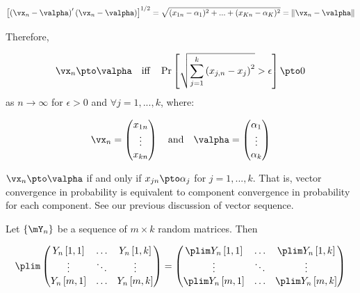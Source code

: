 \begin{equation*}
\left[\left(\vx_n - \valpha\right)'\left(\vx_n - \valpha\right)\right]^{1/2} = \sqrt{(x_{1n}-\alpha_1)^2 + ... + (x_{Kn} - \alpha_K)^2} = \left\| \vx_n - \valpha\right\| 
\end{equation*}


Therefore, 

\begin{equation*}
\vx_n \pto \valpha\quad \mbox{iff}\quad \Pr\left[\sqrt{\sum_{j = 1}^k\left(x_{j,n}- x_j\right)^2}> \epsilon\right]\pto 0
\end{equation*}
%
as $n\to \infty$ for $\epsilon >0$ and $\forall j = 1,...,k$, where:

\begin{equation*}
\vx_n = \begin{pmatrix}
          x_{1n} \\
          \vdots \\
          x_{kn}
        \end{pmatrix}
        \quad
        \mbox{and}
        \quad
\valpha = \begin{pmatrix}
            \alpha_1 \\
            \vdots \\
            \alpha_{k}
          \end{pmatrix}
\end{equation*}

\begin{remark}
  $\vx_n \pto \valpha$ if and only if $x_{jn}\pto \alpha_j$ for $j =1, ...,k$. That is, vector convergence in probability is equivalent to component convergence in probability for each component. See our previous discussion of vector sequence.
\end{remark}

\begin{definition}[Probability Limits of Matrices (and Vectors for $k = 1$)]
Let $\left\lbrace \mY_n \right\rbrace$ be a sequence of $m\times k$ random matrices. Then

\begin{equation*}
  \plim \begin{pmatrix}
          Y_n\left[1, 1\right] & \hdots & Y_n\left[1, k\right] \\
          \vdots & \ddots & \vdots \\
          Y_n\left[m, 1\right] & \hdots & Y_n\left[m, k\right]
        \end{pmatrix} = \begin{pmatrix}
          \plim Y_n\left[1, 1\right] & \hdots & \plim Y_n\left[1, k\right] \\
          \vdots & \ddots & \vdots \\
          \plim Y_n\left[m, 1\right] & \hdots & \plim Y_n\left[m, k\right]
        \end{pmatrix}
\end{equation*}
\end{definition}

